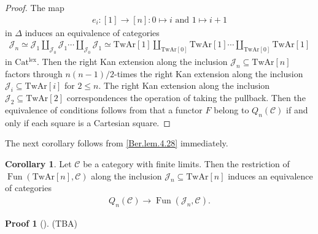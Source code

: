 \documentclass[a4paper,dvipdfmx,11pt,reqno]{amsart}
\DeclareMathOperator{\Fun}{Fun}
\newcommand{\C}{\mathcal{C}}
\newcommand{\J}{\mathcal{J}}
\newcommand{\Catlex}{\mathrm{Cat^{lex}}}
\newcommand{\TwAr}{\mathrm{TwAr}}
\theoremstyle{definition}
\newtheorem{corollary}[theorem]{Corollary}
\newtheorem{newproof}[theorem]{Proof}
\begin{document}
\begin{proof}
  The map 
  \begin{align*}
    e_i : [1] \to [n] : 0 \mapsto i \text{ and } 1 \mapsto i+1
  \end{align*}
  in $\Delta$ induces an equivalence of categories 
  \begin{align*}
    \J_n 
    \simeq \J_1 \coprod_{\J_0} \J_1 \cdots \coprod_{\J_0} \J_1 
    \simeq \TwAr[1] \coprod_{\TwAr[0]} \TwAr[1] \cdots \coprod_{\TwAr[0]} \TwAr[1]
  \end{align*}
  in $\Catlex$.
  Then the right Kan extension along the inclusion $\J_n \subseteq \TwAr[n]$ factors through $n(n-1)/2$-times the right Kan extension along the inclusion $\J_i \subseteq \TwAr[i]$ for $2 \leq n$.
  The right Kan extension along the inclusion $\J_2 \subseteq \TwAr[2]$ correspondences the operation of taking the pullback.
  Then the equivalence of conditions follows from that a functor $F$ belong to $Q_n(\C)$ if and only if each square is a Cartesian square.
\end{proof}

The next corollary follows from \cref{Ber.lem.4.28} immediately.

\begin{corollary} \label{Ber.cor.4.31}
  Let $\C$ be a category with finite limits.
  Then the restriction of $\Fun(\TwAr[n],\C)$ along the inclusion $\J_n \subseteq \TwAr[n]$ induces an equivalence of categories
  \begin{align*}
    Q_n(\C) \to \Fun(\J_n,\C).
  \end{align*}
\end{corollary}

\begin{newproof}[] \label{proof_of_HLS23.prop.3.2}
  (TBA)
\end{newproof}

\printbibliography
\end{document}
